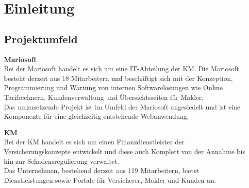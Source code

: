 \newpage

\section{Einleitung}
\label{einleitung}

\subsection{Projektumfeld}
\label{projektumfeld}
\textbf{Mariosoft}
\\

Bei der Mariosoft handelt es sich um eine IT-Abteilung der \ac{KM}. Die Mariosoft besteht derzeit aus 18 Mitarbeitern und beschäftigt sich mit der Konzeption, Programmierung und Wartung von internen Softwarelösungen wie Online Tarifrechnern, Kundenverwaltung und Übersichtsseiten für Makler.
\\
Das umzusetzende Projekt ist im Umfeld der Mariosoft angesiedelt und ist eine Komponente für eine gleichzeitig entstehende Webanwendung.

\textbf{\acl{KM}}
\\

Bei der \ac{KM} handelt es sich um einen Finanzdienstleister der Versicherungskonzepte entwickelt und diese auch Komplett von der Annahme bis hin zur Schadensregulierung verwaltet.\\
Das Unternehmen, bestehend derzeit aus 119 Mitarbeitern, bietet Dienstleistungen sowie Portale für Versicherer, Makler und Kunden an.

